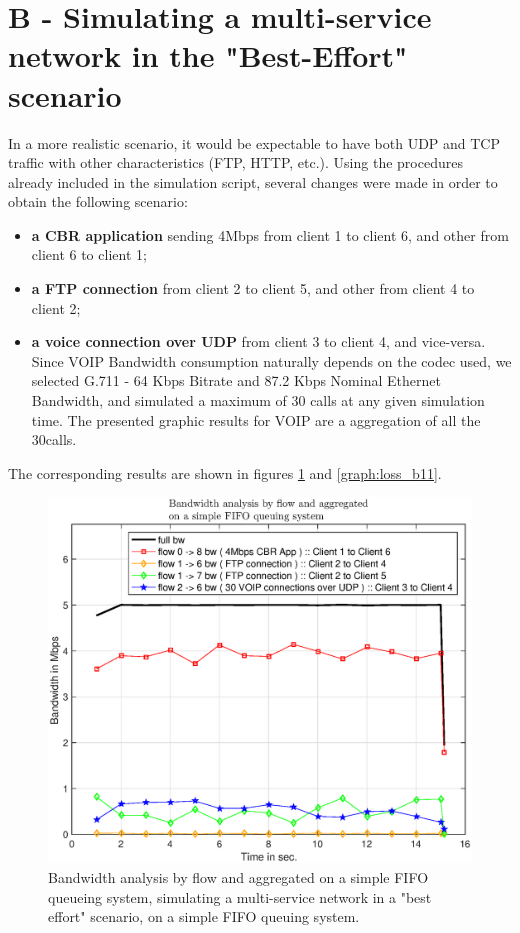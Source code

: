 \documentclass[conference,compsoc]{IEEEtran}
\begin{document}
    
     \section{B - Simulating a multi-service network in  the "Best-Effort" scenario}


In a more realistic scenario, it would be expectable to have both UDP and TCP traffic with other characteristics (FTP, HTTP, etc.).
Using the procedures already included in the simulation script, several changes were made in order to obtain the
following scenario:
\begin{itemize}
\item \textbf{a CBR application} sending 4Mbps from client 1 to client 6, and other from client 6 to client 1;
\item  \textbf{a FTP connection} from client 2 to client 5, and other from client 4 to client 2;
\item  \textbf{a voice connection over UDP} from client 3 to client 4, and vice-versa. Since VOIP Bandwidth consumption naturally depends on the codec used, we selected G.711 - 64 Kbps Bitrate and 87.2 Kbps Nominal Ethernet Bandwidth, and simulated a maximum of 30 calls at any given simulation time. The presented graphic results for VOIP are a aggregation of all the 30calls. 
\end{itemize}
The corresponding results are shown in figures \ref{graph:bw_b1} and \ref{graph:loss_b11}.

  \begin{figure}[H]
    \centering
    \includegraphics[width=1\columnwidth]{EPS/B/bw_b1.eps}
    \caption{Bandwidth analysis by flow and aggregated on a simple FIFO queueing system, simulating a multi-service network in a "best effort" scenario,  on a simple FIFO queuing system.}
    \label{graph:bw_b1}
    \end{figure}
    
\end{document}
